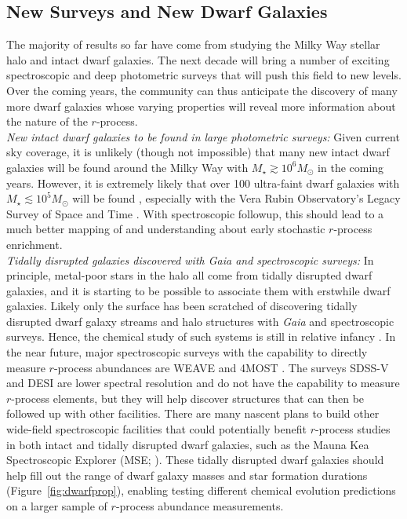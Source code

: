 \documentclass[letterpaper]{article}
\begin{document}
\subsection{New Surveys and New Dwarf Galaxies}


The majority of results so far have come from studying the Milky Way stellar halo and intact dwarf galaxies. The next decade will bring a number of exciting spectroscopic and deep photometric surveys that will push this field to new levels. Over the coming years, the community can thus anticipate the discovery of many more dwarf galaxies whose varying properties will reveal more information about the nature of the $r$-process. \\

\textit{New intact dwarf galaxies to be found in large photometric surveys:}
Given current sky coverage, it is unlikely (though not impossible) that many new intact dwarf galaxies will be found around the Milky Way with $M_\star \gtrsim 10^6 M_\odot$ in the coming years.
However, it is extremely likely that over 100 ultra-faint dwarf galaxies with $M_\star \lesssim 10^5 M_\odot$ will be found \citep{Hargis2014,Manwadkar2022}, especially with the Vera Rubin Observatory's Legacy Survey of Space and Time \citep{Ivezic2019}. With spectroscopic followup, this should lead to a much better mapping of and understanding about early stochastic $r$-process enrichment.\\

\textit{Tidally disrupted galaxies discovered with Gaia and spectroscopic surveys:}
In principle, metal-poor stars in the halo all come from tidally disrupted dwarf galaxies, and it is starting to be possible to associate them with erstwhile dwarf galaxies.
Likely only  the surface has been scratched of discovering tidally disrupted dwarf galaxy streams and halo structures with \emph{Gaia} and spectroscopic surveys. Hence, the chemical study of such systems is still in relative infancy \citep{Roederer10,Ji2020b,Hansen2021,Aguado2021,Matsuno2021,Matsuno2022}.
In the near future, major spectroscopic surveys with the capability to directly measure $r$-process abundances are WEAVE and 4MOST \citep{WEAVE,FOURMOST}. The surveys SDSS-V and DESI are lower spectral resolution and do not have the capability to measure $r$-process elements, but they will help discover structures that can then be followed up with other facilities.
There are many nascent plans to build other wide-field spectroscopic facilities that could potentially benefit $r$-process studies in both intact and tidally disrupted dwarf galaxies, such as the Mauna Kea Spectroscopic Explorer (MSE; \citealt{TheMSEScienceTeam2019}).
These tidally disrupted dwarf galaxies should help fill out the range of dwarf galaxy masses and star formation durations (Figure~\ref{fig:dwarfprop}), enabling testing different chemical evolution predictions on a larger sample of $r$-process abundance measurements.
\\
\end{document}
